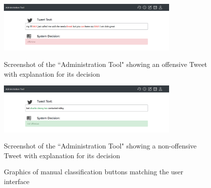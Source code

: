 \begin{figure} [H]
	\centering
	\includegraphics[width=0.8\textwidth]{img/pg_2_12.PNG}\\
	\caption{Screenshot of the ``Administration Tool" showing an offensive Tweet with explanation for its decision}
	\label{fig:admin_tool_offensive}
\end{figure}
\begin{figure} [H]
	\centering
	\includegraphics[width=0.8\textwidth]{img/pg_2_0.PNG}\\
	\caption{Screenshot of the ``Administration Tool" showing a non-offensive Tweet with explanation for its decision}
	\label{fig:admin_tool_not_offensive}
\end{figure}
\begin{figure}[H]
	\caption{Graphics of manual classification buttons matching the user interface}
	\label{fig:impl_buttons}
\end{figure}
